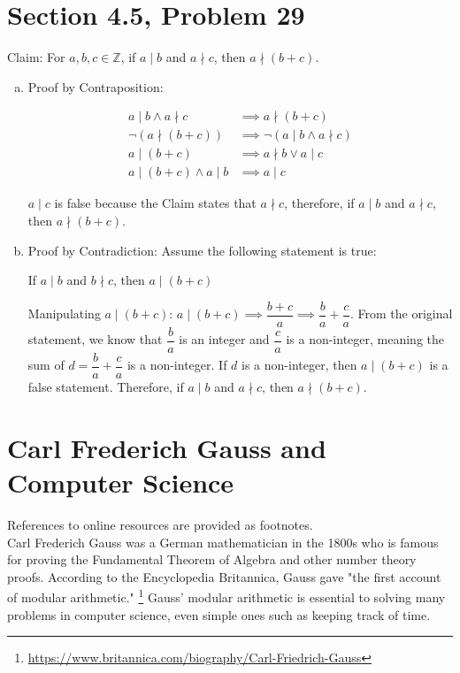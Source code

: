 \documentclass{article}
\begin{document}
\clearpage
\header
\section*{Section 4.5, Problem 29}
Claim: For $a,b,c\in \mathbb{Z}$, if $a\mid b$ and $a\nmid c$, then $a\nmid (b+c)$.
\begin{enumerate}[(a)]
	\item Proof by Contraposition:
		\begin{center}
			\begin{align*}
				a\mid b \wedge a\nmid c &\implies a\nmid (b+c) \\
				\neg (a \nmid (b+c)) &\implies \neg (a\mid b \wedge a\nmid c) \\
				a\mid (b+c) &\implies a\nmid b \lor a\mid c \\
				a\mid (b+c) \wedge a\mid b &\implies a\mid c
			\end{align*}
		\end{center}
	$a\mid c$ is false because the Claim states that $a\nmid c$, therefore, if $a\mid b$ and $a\nmid c$, then $a\nmid (b+c)$.
	\item Proof by Contradiction: Assume the following statement is true:
		\begin{center}
			If $a\mid b$ and $b\nmid c$, then $a\mid (b+c)$
		\end{center}
	Manipulating $a\mid (b+c)$: $a\mid (b+c) \implies \dfrac{b+c}{a} \implies \dfrac{b}{a} + \dfrac{c}{a}$. From the original statement, we know that $\dfrac{b}{a}$ is an integer and $\dfrac{c}{a}$ is a non-integer, meaning the sum of $d=\dfrac{b}{a} + \dfrac{c}{a}$ is a non-integer. If $d$ is a non-integer, then $a\mid (b+c)$ is a false statement. Therefore, if $a\mid b$ and $a\nmid c$, then $a\nmid (b+c)$.
\end{enumerate}

\clearpage
\header
\section*{Carl Frederich Gauss and Computer Science}

References to online resources are provided as footnotes. \\

Carl Frederich Gauss was a German mathematician in the 1800s who is famous for proving the Fundamental Theorem of Algebra and other number theory proofs. According to the Encyclopedia Britannica, Gauss gave "the first account of modular arithmetic." \footnote{\url{https://www.britannica.com/biography/Carl-Friedrich-Gauss}}
Gauss' modular arithmetic is essential to solving many problems in computer science, even simple ones such as keeping track of time.
\end{document}
